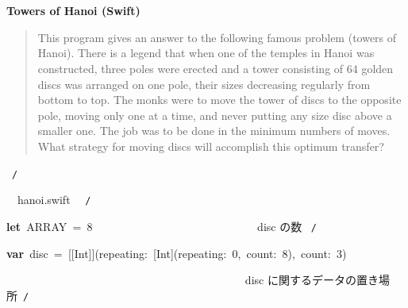 \documentclass[a4paper,10pt]{article}
\def\mc{\relax}
\begin{document}
\tt\mc 

\noindent
\mbox{}\rm\mc {\tt /}{\tt *}\  \hrulefill *
\tt\mc 

\noindent
\mbox{}\hfill

\noindent
\mbox{}\rm\mc \ %

\centerline{\bf Towers of Hanoi (Swift)}

\begin{quote}

This program gives an answer to the following famous problem (towers of
Hanoi).
There is a legend that when one of the temples in Hanoi was constructed,
three poles were erected and a tower consisting of 64 golden discs was
arranged on one pole, their sizes decreasing regularly from bottom to top.
The monks were to move the tower of discs to the opposite pole, moving
only one at a time, and never putting any size disc above a smaller one.
The job was to be done in the minimum numbers of moves. What strategy for
moving discs will accomplish this optimum transfer?
\end{quote}

\tt\mc 

\noindent
\mbox{}\hfill

\noindent
\mbox{}\rm\mc {\tt *} \hrulefill \rm\mc \ {\tt *}{\tt /}
\tt\mc 

\noindent
\mbox{}\hfill

\noindent
\mbox{}\rm\mc {\tt /}{\tt *}\  \hrulefill\ hanoi.swift \ \hrulefill \rm\mc \ {\tt *}{\tt /}
\tt\mc 

\noindent
\mbox{}\hfill

\noindent
\mbox{}\textbf{let}{\tt\mc \ }ARRAY{\tt\mc \ }={\tt\mc \ }8{\tt\mc \ }{\tt\mc \ }{\tt\mc \ }{\tt\mc \ }{\tt\mc \ }{\tt\mc \ }{\tt\mc \ }{\tt\mc \ }{\tt\mc \ }{\tt\mc \ }{\tt\mc \ }{\tt\mc \ }{\tt\mc \ }{\tt\mc \ }{\tt\mc \ }{\tt\mc \ }{\tt\mc \ }{\tt\mc \ }{\tt\mc \ }{\tt\mc \ }{\tt\mc \ }{\tt\mc \ }{\tt\mc \ }{\tt\mc \ }{\tt\mc \ }{\tt\mc \ }{\tt\mc \ }\rm\mc {\tt /}{\tt *}\  \ disc の数 \hfill \rm\mc \ {\tt *}{\tt /}
\tt\mc 

\noindent
\mbox{}\hfill

\noindent
\mbox{}\textbf{var}{\tt\mc \ }disc{\tt\mc \ }={\tt\mc \ }[[Int]](repeating:{\tt\mc \ }[Int](repeating:{\tt\mc \ }0,{\tt\mc \ }count:{\tt\mc \ }8),{\tt\mc \ }count:{\tt\mc \ }3)

\noindent
\mbox{}{\tt\mc \ }{\tt\mc \ }{\tt\mc \ }{\tt\mc \ }{\tt\mc \ }{\tt\mc \ }{\tt\mc \ }{\tt\mc \ }{\tt\mc \ }{\tt\mc \ }{\tt\mc \ }{\tt\mc \ }{\tt\mc \ }{\tt\mc \ }{\tt\mc \ }{\tt\mc \ }{\tt\mc \ }{\tt\mc \ }{\tt\mc \ }{\tt\mc \ }{\tt\mc \ }{\tt\mc \ }{\tt\mc \ }{\tt\mc \ }{\tt\mc \ }{\tt\mc \ }{\tt\mc \ }{\tt\mc \ }{\tt\mc \ }{\tt\mc \ }{\tt\mc \ }{\tt\mc \ }{\tt\mc \ }{\tt\mc \ }{\tt\mc \ }{\tt\mc \ }{\tt\mc \ }{\tt\mc \ }{\tt\mc \ }{\tt\mc \ }\rm\mc {\tt /}{\tt *}\  \ disc に関するデータの置き場所\hfill \rm\mc \ {\tt *}{\tt /}
\tt\mc 
\end{document}
